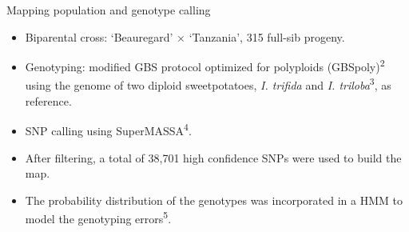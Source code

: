 \documentclass[final, 13pt]{beamer}
\newlength{\twocolwid}
\begin{document}
\begin{frame}[t]
\begin{columns}[t]
\begin{column}{\twocolwid}
\vspace{1.450cm}
\begin{block}{Mapping population and genotype calling}
    \begin{itemize}
      \item Biparental cross: ‘Beauregard’ $\times$ ‘Tanzania’, 315
        full-sib progeny.%
    \item Genotyping: modified GBS protocol optimized for polyploids
      (GBSpoly)\textsuperscript{2} using the genome of two diploid sweetpotatoes, 
      \textit{I. trifida} and \textit{I. triloba}\textsuperscript{3}, as reference. %
    \item SNP calling using SuperMASSA\textsuperscript{4}. %
      \item After filtering, a total of 38,701 high
        confidence SNPs were used to build the map. %
         \item The probability distribution of the genotypes was incorporated in a HMM to model the genotyping errors\textsuperscript{5}.
    \end{itemize}
    

\end{block}
\end{column}
\end{columns}
\end{frame}
\end{document}
